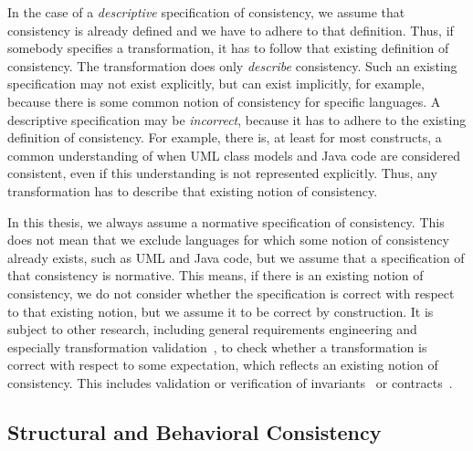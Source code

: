 In the case of a \emph{descriptive} specification of consistency, we assume that consistency is already defined and we have to adhere to that definition.
Thus, if somebody specifies a transformation, it has to follow that existing definition of consistency. 
The transformation does only \emph{describe} consistency.
Such an existing specification may not exist explicitly, but can exist implicitly, for example, because there is some common notion of consistency for specific languages.
A descriptive specification may be \emph{incorrect}, because it has to adhere to the existing definition of consistency.
For example, there is, at least for most constructs, a common understanding of when \gls{UML} class models and Java code are considered consistent, even if this understanding is not represented explicitly.
Thus, any transformation has to describe that existing notion of consistency.

In this thesis, we always assume a normative specification of consistency.
This does not mean that we exclude languages for which some notion of consistency already exists, such as \gls{UML} and Java code, but we assume that a specification of that consistency is normative.
This means, if there is an existing notion of consistency, we do not consider whether the specification is correct with respect to that existing notion, but we assume it to be correct by construction.
It is subject to other research, including general requirements engineering and especially transformation validation~\cite{rahim2015SurveyTransformationVerification-SoSym}, to check whether a transformation is correct with respect to some expectation, which reflects an existing notion of consistency.
This includes validation or verification of invariants~\cite{cabot2010VerificationInvariants-JSS} or contracts~\cite{azizi2017ContractVerification-ICCKE, vallecillo2012FormalTesting-FMMDE}.


\subsection{Structural and Behavioral Consistency}
\label{chap:networks:notions:types}

